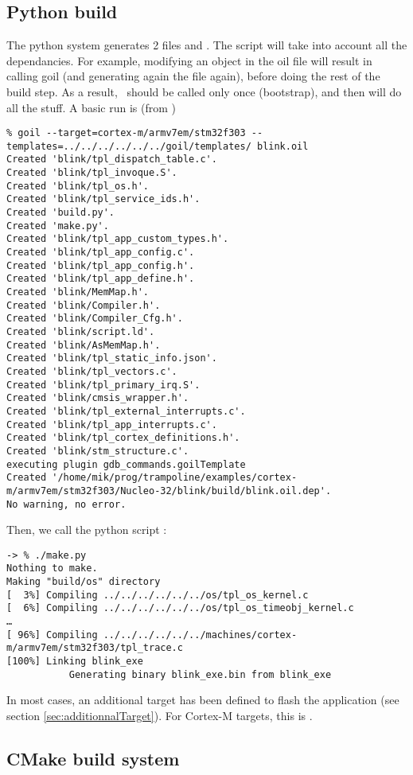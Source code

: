 \subsection{Python build}
The python system generates 2 files  and . The script will take into account all the dependancies. For example, modifying an object in the oil file will result in calling goil (and generating again the  file again), before doing the rest of the build step. As a result, \goil\ should be called only once (bootstrap), and then  will do all the stuff.
A basic run is (from )
\begin{verbatim}
% goil --target=cortex-m/armv7em/stm32f303 --templates=../../../../../../goil/templates/ blink.oil
Created 'blink/tpl_dispatch_table.c'.
Created 'blink/tpl_invoque.S'.
Created 'blink/tpl_os.h'.
Created 'blink/tpl_service_ids.h'.
Created 'build.py'.
Created 'make.py'.
Created 'blink/tpl_app_custom_types.h'.
Created 'blink/tpl_app_config.c'.
Created 'blink/tpl_app_config.h'.
Created 'blink/tpl_app_define.h'.
Created 'blink/MemMap.h'.
Created 'blink/Compiler.h'.
Created 'blink/Compiler_Cfg.h'.
Created 'blink/script.ld'.
Created 'blink/AsMemMap.h'.
Created 'blink/tpl_static_info.json'.
Created 'blink/tpl_vectors.c'.
Created 'blink/tpl_primary_irq.S'.
Created 'blink/cmsis_wrapper.h'.
Created 'blink/tpl_external_interrupts.c'.
Created 'blink/tpl_app_interrupts.c'.
Created 'blink/tpl_cortex_definitions.h'.
Created 'blink/stm_structure.c'.
executing plugin gdb_commands.goilTemplate
Created '/home/mik/prog/trampoline/examples/cortex-m/armv7em/stm32f303/Nucleo-32/blink/build/blink.oil.dep'.
No warning, no error.
\end{verbatim}
Then, we call the python script :
\begin{verbatim}
-> % ./make.py 
Nothing to make.
Making "build/os" directory
[  3%] Compiling ../../../../../../os/tpl_os_kernel.c
[  6%] Compiling ../../../../../../os/tpl_os_timeobj_kernel.c
…
[ 96%] Compiling ../../../../../../machines/cortex-m/armv7em/stm32f303/tpl_trace.c
[100%] Linking blink_exe
		   Generating binary blink_exe.bin from blink_exe	
\end{verbatim}

In most cases, an additional target has been defined to flash the application (see section \ref{sec:additionnalTarget}). For Cortex-M targets, this is .

\subsection{CMake build system}

